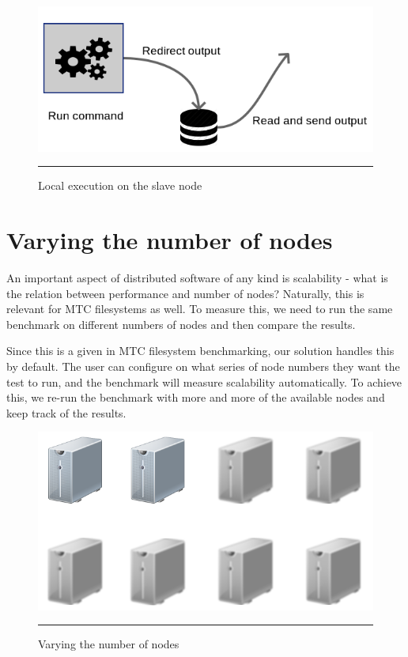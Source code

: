 \begin{figure}[H]
  \centering
    \includegraphics[scale=0.5]{Figures/local_exec.png}
    \rule{25em}{0.5pt}
  \caption[Local command execution]{Local execution on the slave node}
  \label{fig:local_exec}
\end{figure}



\section{Varying the number of nodes}

An important aspect of distributed software of any kind is scalability - what is the relation between performance and number of nodes? Naturally, this is relevant for MTC filesystems as well. To measure this, we need to run the same benchmark on different numbers of nodes and then compare the results.

Since this is a given in MTC filesystem benchmarking, our solution handles this by default. The user can configure on what series of node numbers they want the test to run, and the benchmark will measure scalability automatically. To achieve this, we re-run the benchmark with more and more of the available nodes and keep track of the results.

\begin{figure}[H]
  \centering
    \includegraphics[scale=0.5]{Figures/nodes_grayed.png}
    \rule{25em}{0.5pt}
  \caption[Varying the number of nodes]{Varying the number of nodes}
  \label{fig:nodes_grayed}
\end{figure}

